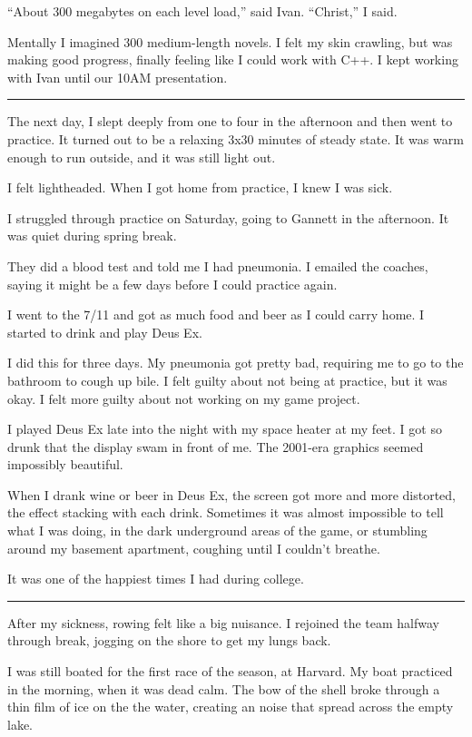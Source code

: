 ``About 300 megabytes on each level load,'' said Ivan.  ``Christ,'' I said.

Mentally I imagined 300 medium-length novels.  I felt my skin crawling, but was
making good progress, finally feeling like I could work with C++.  I kept
working with Ivan until our 10AM presentation.

\plainfancybreak{12pt}{2}{* * *}

The next day, I slept deeply from one to four in the afternoon and then went to
practice.  It turned out to be a relaxing 3x30 minutes of steady state.  It
was warm enough to run outside, and it was still light out.

I felt lightheaded.  When I got home from practice, I knew I was sick.  

I struggled through practice on Saturday, going to Gannett in the afternoon.  It
was quiet during spring break.

They did a blood test and told me I had pneumonia.  I emailed the coaches,
saying it might be a few days before I could practice again.

I went to the 7/11 and got as much food and beer as I could carry home.  I
started to drink and play Deus Ex.  

I did this for three days.  My pneumonia got pretty bad, requiring me to go to
the bathroom to cough up bile.  I felt guilty about not being at practice, but
it was okay.  I felt more guilty about not working on my game project. 
 
I played Deus Ex late into the night with my space heater at my feet.  I got so
drunk that the display swam in front of me.  The 2001-era graphics seemed
impossibly beautiful.  

When I drank wine or beer in Deus Ex, the screen got more and more distorted,
the effect stacking with each drink.  Sometimes it was almost impossible to tell
what I was doing, in the dark underground areas of the game, or stumbling around
my basement apartment, coughing until I couldn't breathe.

It was one of the happiest times I had during college.

\plainfancybreak{12pt}{2}{* * *}

After my sickness, rowing felt like a big nuisance.  I rejoined the team halfway
through break, jogging on the shore to get my lungs back.  

I was still boated for the first race of the season, at Harvard.  My boat
practiced in the morning, when it was dead calm.  The bow of the shell broke
through a thin film of ice on the the water, creating an noise that spread
across the empty lake.   
 
